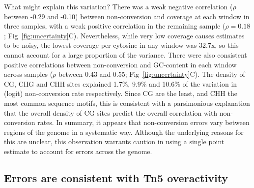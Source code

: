 \documentclass[10pt,draft,letterpaper]{article}
\begin{document}
What might explain this variation?
There was a weak negative correlation ($\rho$ between -0.29 and -0.10) between non-conversion and coverage at each window in three samples, with a weak positive correlation in the remaining sample ($\rho = 0.18$; Fig~\ref{fig:uncertainty}C).
Nevertheless, while very low coverage causes estimates to be noisy, the lowest coverage per cytosine in any window was 32.7x, so this cannot account for a large proportion of the variance.
There were also consistent positive correlations between non-conversion and GC-content in each window across samples ($\rho$ between 0.43 and 0.55; Fig~\ref{fig:uncertainty}C).
The density of CG, CHG and CHH sites explained 1.7\%, 9.9\% and 10.6\% of the variation in (logit) non-conversion rate respectively.
Since CG are the least, and CHH the most common sequence motifs, this is consistent with a parsimonious explanation that the overall density of CG sites predict the overall correlation with non-conversion rates.
In summary, it appears that non-conversion errors vary between regions of the genome in a systematic way.
Although the underlying reasons for this are unclear, this observation warrants caution in using a single point estimate to account for errors across the genome.

\subsection*{Errors are consistent with Tn5 overactivity}
\end{document}
